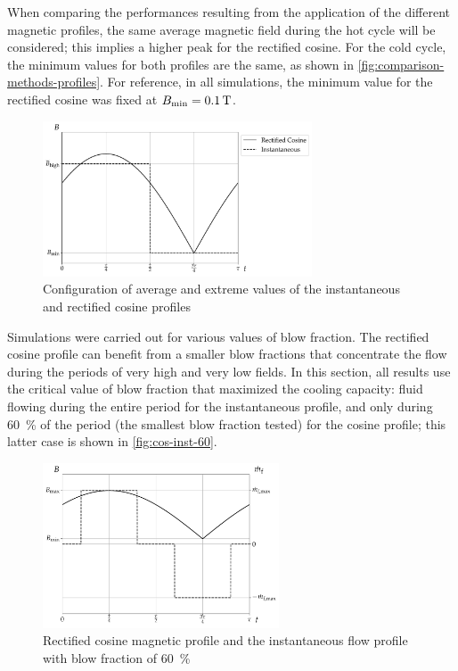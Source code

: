 \documentclass[referee]{svjour3}
\begin{document}
When comparing the performances resulting from the application of the different magnetic profiles, the same average magnetic field during the hot cycle will be considered; this implies a higher peak for the rectified cosine. For the cold cycle, the minimum values for both profiles are the same, as shown in \autoref{fig:comparison-methods-profiles}. For reference, in all simulations,  the minimum value for the rectified cosine was fixed at ${B}_{\mathrm{min}} = \SI{0.1}{\tesla}$. 

\begin{figure}[!ht]
  \centering
\includegraphics[width=8cm]{profiles_it_and_rc_same_minimum}
  \caption{Configuration of average and extreme values of the instantaneous and rectified cosine profiles }
  \label{fig:comparison-methods-profiles}
\end{figure}

Simulations were carried out for various values of blow fraction. The rectified cosine profile can benefit from a smaller blow fractions that concentrate the flow during the periods of very high and very low fields. In this section, all results use the critical value of blow fraction that maximized the cooling capacity: fluid flowing during the entire period for the instantaneous profile, and only during \SI{60}{\percent} of the period (the smallest blow fraction tested) for the cosine profile; this latter case is shown in \autoref{fig:cos-inst-60}.

\begin{figure}[!ht]
  \centering
  \includegraphics[width=7cm]{profiles_rc_and_flow_instantaneous}
  \caption{Rectified cosine magnetic profile and the instantaneous flow profile with blow fraction of \SI{60}{\percent}}
  \label{fig:cos-inst-60}
\end{figure}
\end{document}

